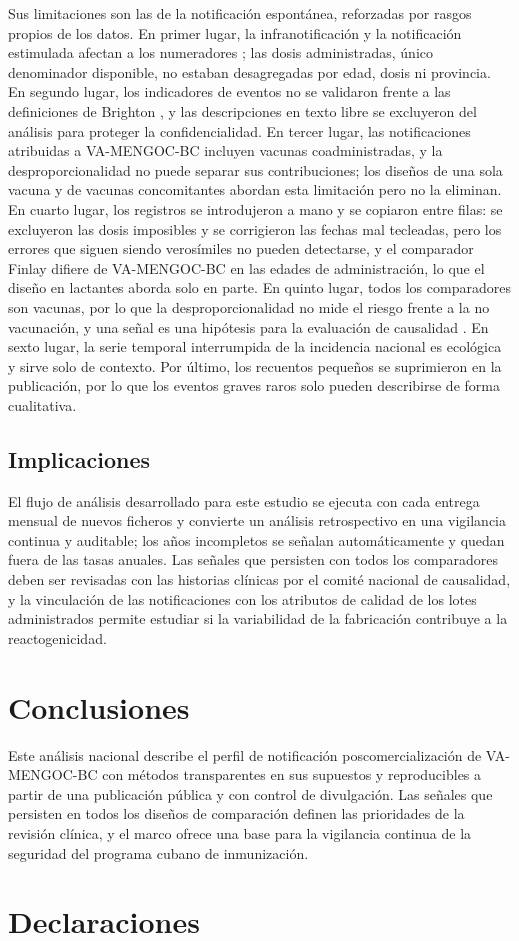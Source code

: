 \documentclass[11pt]{article}
\begin{document}
Sus limitaciones son las de la notificación espontánea, reforzadas por rasgos propios de los datos.
En primer lugar, la infranotificación y la notificación estimulada afectan a los numeradores
\cite{Hazell2006,Pariente2007}; las dosis administradas, único denominador disponible, no estaban
desagregadas por edad, dosis ni provincia. En segundo lugar, los indicadores de eventos no se
validaron frente a las definiciones de Brighton \cite{Kohl2008}, y las descripciones en texto libre
se excluyeron del análisis para proteger la confidencialidad. En tercer lugar, las notificaciones
atribuidas a VA-MENGOC-BC incluyen vacunas coadministradas, y la desproporcionalidad no puede separar
sus contribuciones; los diseños de una sola vacuna y de vacunas concomitantes abordan esta limitación
pero no la eliminan. En cuarto lugar, los registros se introdujeron a mano y se copiaron entre filas:
se excluyeron las dosis imposibles y se corrigieron las fechas mal tecleadas, pero los errores que
siguen siendo verosímiles no pueden detectarse, y el comparador Finlay difiere de VA-MENGOC-BC en
las edades de administración, lo que el diseño en lactantes aborda solo en parte. En quinto lugar,
todos los comparadores son vacunas, por lo que la desproporcionalidad no mide el riesgo
frente a la no vacunación, y una señal es una hipótesis para la evaluación de causalidad
\cite{WHO2018Causality,Fusaroli2026Causal}. En sexto lugar, la serie temporal interrumpida de la
incidencia nacional es ecológica y sirve solo de contexto. Por último, los recuentos pequeños se
suprimieron en la publicación, por lo que los eventos graves raros solo pueden describirse de forma
cualitativa.

\subsection{Implicaciones}\label{sec:d-implications}
El flujo de análisis desarrollado para este estudio se ejecuta con cada entrega mensual de nuevos
ficheros y convierte un análisis retrospectivo en una vigilancia continua y auditable; los años
incompletos se señalan automáticamente y quedan fuera de las tasas anuales. Las señales
que persisten con todos los comparadores deben ser revisadas con las historias clínicas por el
comité nacional de causalidad, y la vinculación de las notificaciones con los atributos de calidad
de los lotes administrados permite estudiar si la variabilidad de la fabricación contribuye a la
reactogenicidad.

\section{Conclusiones}\label{sec:conclusions}
Este análisis nacional describe el perfil de notificación poscomercialización de VA-MENGOC-BC con
métodos transparentes en sus supuestos y reproducibles a partir de una publicación pública y con
control de divulgación. Las señales que persisten en todos los diseños de comparación definen las
prioridades de la revisión clínica, y el marco ofrece una base para la vigilancia continua de la
seguridad del programa cubano de inmunización.

\section*{Declaraciones}




\end{document}
